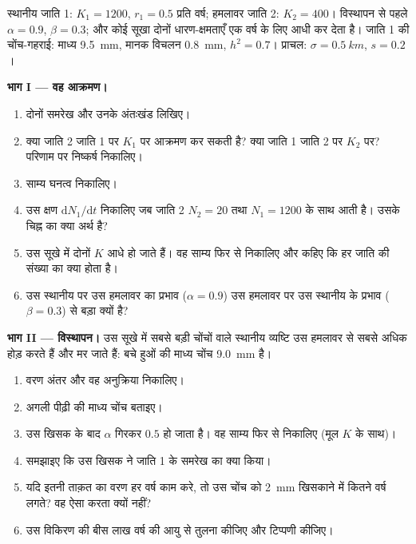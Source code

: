 \begin{problem}
\label{pb:b2:speciation:1}
स्थानीय जाति 1: $K_1 = 1200$, $r_1 = 0.5$ प्रति वर्ष; हमलावर
जाति 2: $K_2 = 400$। विस्थापन से पहले $\alpha = 0.9$, $\beta =
0.3$; और कोई सूखा दोनों धारण-क्षमताएँ एक वर्ष के लिए आधी कर देता है। जाति 1 की
चोंच-गहराई: माध्य \qty{9.5}{mm}, मानक विचलन
\qty{0.8}{mm}, $h^{2} = 0.7$।  प्राचल: $\sigma =
\qty{0.5}{km}$, $s = 0.2$।

\medskip
\noindent\textbf{भाग I --- वह आक्रमण।}
\begin{enumerate}
  \item दोनों समरेख और उनके अंतःखंड लिखिए।
  \item क्या जाति 2 जाति 1 पर $K_1$ पर आक्रमण कर सकती है? क्या जाति 1
        जाति 2 पर $K_2$ पर? परिणाम पर निष्कर्ष निकालिए।
  \item साम्य घनत्व निकालिए।
  \item उस क्षण $\mathrm{d}N_1/\mathrm{d}t$ निकालिए जब जाति 2
        $N_2 = 20$ तथा $N_1 = 1200$ के साथ आती है। उसके चिह्न का क्या
        अर्थ है?
  \item उस सूखे में दोनों $K$ आधे हो जाते हैं। वह साम्य फिर से निकालिए
        और कहिए कि हर जाति की संख्या का क्या होता है।
  \item उस स्थानीय पर उस हमलावर का प्रभाव ($\alpha = 0.9$) उस हमलावर पर
        उस स्थानीय के प्रभाव ($\beta = 0.3$) से बड़ा क्यों है?
\end{enumerate}

\medskip
\noindent\textbf{भाग II --- विस्थापन।}
उस सूखे में सबसे बड़ी चोंचों वाले स्थानीय व्यष्टि उस हमलावर से
सबसे अधिक होड़ करते हैं और मर जाते हैं: बचे हुओं की माध्य
चोंच \qty{9.0}{mm} है।
\begin{enumerate}[resume]
  \item वरण अंतर और वह अनुक्रिया निकालिए।
  \item अगली पीढ़ी की माध्य चोंच बताइए।
  \item उस खिसक के बाद $\alpha$ गिरकर $0.5$ हो जाता है। वह साम्य
        फिर से निकालिए (मूल $K$ के साथ)।
  \item समझाइए कि उस खिसक ने जाति 1 के समरेख का क्या किया।
  \item यदि इतनी ताक़त का वरण हर वर्ष काम करे, तो उस चोंच को
        \qty{2}{mm} खिसकाने में कितने वर्ष लगते? वह ऐसा करता
        क्यों नहीं?
  \item उस विकिरण की बीस लाख वर्ष की आयु से तुलना कीजिए और
        टिप्पणी कीजिए।
\end{enumerate}


\end{problem}
